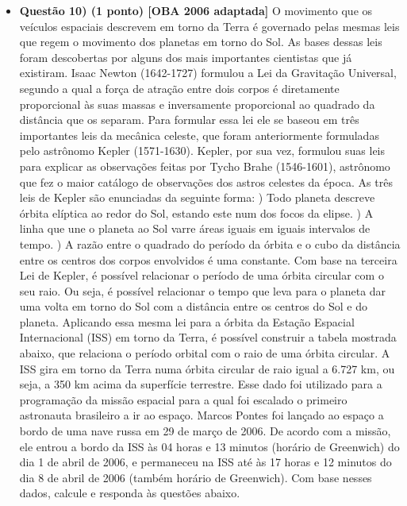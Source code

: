 \documentclass[a4paper, 12pt]{article}
\begin{document}
\begin{flushleft}
\begin{itemize}
            \item \textbf{Questão 10) (1 ponto) [OBA 2006 adaptada]} O movimento que os veículos espaciais descrevem em torno da Terra é governado pelas mesmas leis que regem o movimento dos planetas em torno do Sol. As bases dessas leis foram descobertas por alguns dos mais importantes cientistas que já existiram. Isaac Newton (1642-1727) formulou a Lei da Gravitação Universal, segundo a qual a força de atração entre dois corpos é diretamente proporcional às suas massas e inversamente proporcional ao quadrado da distância que os separam. Para formular essa lei ele se baseou em três importantes leis da mecânica celeste, que foram anteriormente formuladas pelo astrônomo Kepler (1571-1630). Kepler, por sua vez, formulou suas leis para explicar as observações feitas por Tycho Brahe (1546-1601), astrônomo que fez o maior catálogo de observações dos astros celestes da época. As três leis de Kepler são enunciadas da seguinte forma: \linebreak {}) Todo planeta descreve órbita elíptica ao redor do Sol, estando este num dos focos da elipse. ) A linha que une o planeta ao Sol varre áreas iguais em iguais intervalos de tempo. ) A razão entre o quadrado do período da órbita e o cubo da distância entre os centros dos corpos envolvidos é uma constante. \linebreak \linebreak Com base na terceira Lei de Kepler, é possível relacionar o período de uma órbita circular com o seu raio. Ou seja, é possível relacionar o tempo que leva para o planeta dar uma volta em torno do Sol com a distância entre os centros do Sol e do planeta. Aplicando essa mesma lei para a órbita da Estação Espacial Internacional (ISS) em torno da Terra, é possível construir a tabela mostrada abaixo, que relaciona o período orbital com o raio de uma órbita circular. \linebreak \linebreak A ISS gira em torno da Terra numa órbita circular de raio igual a 6.727 km, ou seja, a 350 km acima da superfície terrestre. Esse dado foi utilizado para a programação da missão espacial para a qual foi escalado o primeiro astronauta brasileiro a ir ao espaço. Marcos Pontes foi lançado ao espaço a bordo de uma nave russa em 29 de março de 2006. De acordo com a missão, ele entrou a bordo da ISS às 04 horas e 13 minutos (horário de Greenwich) do dia 1 de abril de 2006, e permaneceu na ISS até às 17 horas e 12 minutos do dia 8 de abril de 2006 (também horário de Greenwich). Com base nesses dados, calcule e responda às questões abaixo.

\end{itemize}
\end{flushleft}
\end{document}

